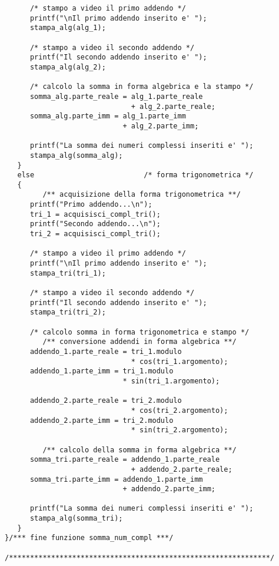 \documentclass[a4paper,10pt]{article}
\begin{document}
\begin{verbatim}
      /* stampo a video il primo addendo */
      printf("\nIl primo addendo inserito e' ");
      stampa_alg(alg_1);

      /* stampo a video il secondo addendo */
      printf("Il secondo addendo inserito e' ");
      stampa_alg(alg_2);

      /* calcolo la somma in forma algebrica e la stampo */
      somma_alg.parte_reale = alg_1.parte_reale
                              + alg_2.parte_reale;
      somma_alg.parte_imm = alg_1.parte_imm
                            + alg_2.parte_imm;

      printf("La somma dei numeri complessi inseriti e' ");
      stampa_alg(somma_alg);
   }
   else                          /* forma trigonometrica */
   {
         /** acquisizione della forma trigonometrica **/
      printf("Primo addendo...\n");
      tri_1 = acquisisci_compl_tri();
      printf("Secondo addendo...\n");
      tri_2 = acquisisci_compl_tri();

      /* stampo a video il primo addendo */
      printf("\nIl primo addendo inserito e' ");
      stampa_tri(tri_1);

      /* stampo a video il secondo addendo */
      printf("Il secondo addendo inserito e' ");
      stampa_tri(tri_2);

      /* calcolo somma in forma trigonometrica e stampo */
         /** conversione addendi in forma algebrica **/
      addendo_1.parte_reale = tri_1.modulo
                              * cos(tri_1.argomento);
      addendo_1.parte_imm = tri_1.modulo
                            * sin(tri_1.argomento);

      addendo_2.parte_reale = tri_2.modulo
                              * cos(tri_2.argomento);		
      addendo_2.parte_imm = tri_2.modulo
                              * sin(tri_2.argomento);		

         /** calcolo della somma in forma algebrica **/
      somma_tri.parte_reale = addendo_1.parte_reale
                              + addendo_2.parte_reale;
      somma_tri.parte_imm = addendo_1.parte_imm
                            + addendo_2.parte_imm;

      printf("La somma dei numeri complessi inseriti e' ");
      stampa_alg(somma_tri);
   }
}/*** fine funzione somma_num_compl ***/

/**************************************************************/


\end{verbatim}
\end{document}
